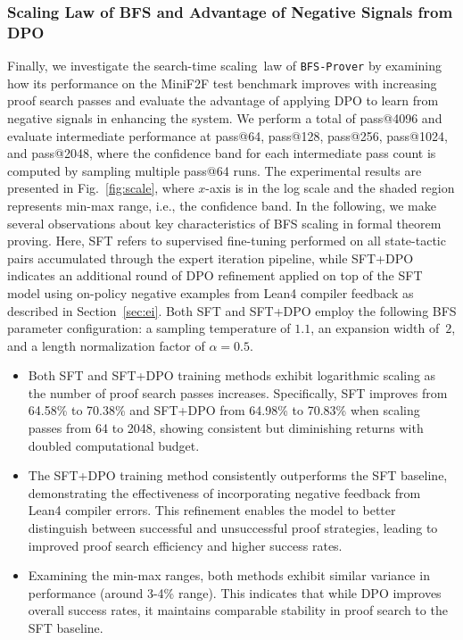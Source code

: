\documentclass[10pt,english]{article}
\begin{document}
\subsubsection{Scaling Law of BFS and Advantage of Negative Signals from DPO}
Finally, we investigate the search-time scaling~law of \texttt{BFS-Prover} by examining how its performance on the MiniF2F test benchmark improves with increasing proof search passes and evaluate the advantage of applying DPO to learn from negative signals in enhancing the system. We perform a total of pass@4096 and evaluate intermediate performance at pass@64, pass@128, pass@256, pass@1024, and pass@2048, where the confidence band for each intermediate pass count is computed by sampling multiple pass@64 runs. The experimental results are presented in Fig.~\ref{fig:scale}, where $x$-axis is in the log scale and the shaded region represents min-max range, i.e., the confidence band. In the following, we make several observations about key characteristics of BFS scaling in formal theorem proving. Here, SFT refers to supervised fine-tuning performed on all state-tactic pairs accumulated through the expert iteration pipeline, while SFT+DPO indicates an additional round of DPO refinement applied on top of the SFT model using on-policy negative examples from Lean4 compiler feedback as described in Section~\ref{sec:ei}. Both SFT and SFT+DPO employ the following BFS parameter configuration: a sampling temperature of $1.1$, an expansion width of~$2$, and a length normalization factor of $\alpha=0.5$.

\begin{itemize}
\item Both SFT and SFT+DPO training methods exhibit logarithmic scaling as the number of proof search passes increases. Specifically, SFT improves from 64.58\% to 70.38\% and SFT+DPO from 64.98\% to 70.83\% when scaling passes from 64 to 2048, showing consistent but diminishing returns with doubled computational budget.

\item The SFT+DPO training method consistently outperforms the SFT baseline, demonstrating the effectiveness of incorporating negative feedback from Lean4 compiler errors. This refinement enables the model to better distinguish between successful and unsuccessful proof strategies, leading to improved proof search efficiency and higher success rates.

\item Examining the min-max ranges, both methods exhibit similar variance in performance (around 3-4\% range). This indicates that while DPO improves overall success rates, it maintains comparable stability in proof search to the SFT baseline.
\end{itemize}
\end{document}
